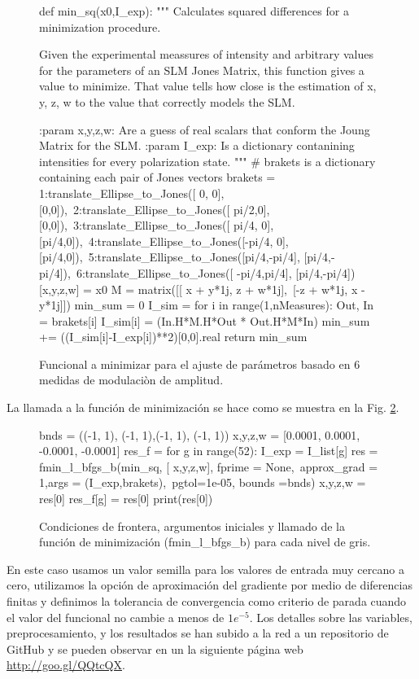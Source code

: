 \begin{figure}
\begin{python}
def min_sq(x0,I_exp):
    """ Calculates squared differences for a minimization procedure.

    Given the experimental meassures of intensity and arbitrary values for 
    the parameters of an SLM Jones Matrix, this function gives a value to
    minimize. That value tells how close is the estimation of x, y, z, w 
    to the value that correctly models the SLM.

    :param x,y,z,w: Are a guess of real scalars that conform the Joung Matrix for the SLM.
    :param I_exp: Is a dictionary contanining intensities for every polarization state.
    """
    # brakets is a dictionary containing each pair of Jones vectors
    brakets = {1:translate_Ellipse_to_Jones([ 0,   0],      [0,0]),\
           2:translate_Ellipse_to_Jones([ pi/2,0],      [0,0]),\
           3:translate_Ellipse_to_Jones([ pi/4, 0],    [pi/4,0]),\
           4:translate_Ellipse_to_Jones([-pi/4, 0],    [pi/4,0]),\
           5:translate_Ellipse_to_Jones([pi/4,-pi/4],   [pi/4,-pi/4]),\
           6:translate_Ellipse_to_Jones([ -pi/4,pi/4],  [pi/4,-pi/4])}
    [x,y,z,w] = x0
    M = matrix([[ x + y*1j, z + w*1j],\
                [-z + w*1j, x - y*1j]])
    min_sum = 0
    I_sim = {}
    for i in range(1,nMeasures):
        Out, In = brakets[i]
        I_sim[i] = (In.H*M.H*Out * Out.H*M*In)
        min_sum += ((I_sim[i]-I_exp[i])**2)[0,0].real    
    return min_sum
\end{python}
\caption{Funcional a minimizar para el ajuste de parámetros basado en
  6 medidas de modulaciòn de amplitud.}
\label{fig:SLM_functional}
\end{figure}
\pagebreak
La llamada a la función de minimización se hace como se muestra en la
Fig. \ref{fig:SLM_minimization}.
\begin{figure}
\begin{python}
bnds = ((-1, 1), (-1, 1),(-1, 1), (-1, 1))
x,y,z,w = [0.0001, 0.0001, -0.0001, -0.0001] 
res_f = {}
for g in range(52):
    I_exp = I_list[g]
    res = fmin_l_bfgs_b(min_sq, [ x,y,z,w], fprime = None,\
                         approx_grad = 1,args = (I_exp,brakets),\
                         pgtol=1e-05, bounds =bnds)
    x,y,z,w = res[0]
    res_f[g] = res[0]
    print(res[0])
\end{python}
\caption{Condiciones de frontera, argumentos iniciales y llamado de la
función de minimización (fmin\_l\_bfgs\_b) para cada nivel de gris.}
\label{fig:SLM_minimization}
\end{figure}
En este caso usamos un valor semilla para los valores de entrada muy
cercano a cero, utilizamos la opción de aproximación del gradiente
por medio de diferencias finitas y definimos la tolerancia de
convergencia como criterio de parada cuando el valor del funcional no
cambie a menos de $1e^{-5}$. Los detalles sobre las variables,
preprocesamiento, y los resultados se han subido a la red a un
repositorio de GitHub y se pueden observar en un la siguiente página
web \href{http://goo.gl/QQtcQX}{http://goo.gl/QQtcQX}.

